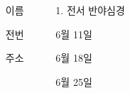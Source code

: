 \documentclass[	20pt, 
							a0paper, 
							landscape, %
							margin=0mm, %
							innermargin=4mm,  		%
							blockverticalspace=4mm, %
							colspace=5mm, 
							subcolspace=0mm
							]{tikzposter}
\begin{document}
\begin{columns}
{		}

		{
			\setlength{\leftmargini}{7em}			
			\setlength{\labelsep}{1em} %

			\begin{LARGE}
			\begin{itemize}
			\item [이름]
			\item [전번]
			\item [주소] 
			\end{itemize}
			\end{LARGE}

		}






			{				
			\setlength{\leftmargini}{9em}			
			\setlength{\labelsep}{1em} %

			\begin{LARGE}
			\begin{itemize}
			\item [1.] 전서 반야심경
			\item [6월 11일]
			\item [6월 18일]
			\item [6월 25일]
			\end{itemize}
			\end{LARGE}
		}





	\end{columns}
\end{document}
